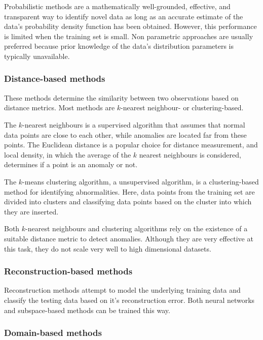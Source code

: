 Probabilistic methods are a mathematically well-grounded, effective, and transparent way to identify novel data as long as an accurate estimate of the data's probability density function has been obtained. However, this performance is limited when the training set is small. Non parametric approaches are usually preferred because prior knowledge of the data's distribution parameters is typically unavailable.

\subsubsection{Distance-based methods}

These methods determine the similarity between two observations based on distance metrics. Most methods are $k$-nearest neighbour- or clustering-based.\par

The $k$-nearest neighbours is a supervised algorithm that assumes that normal data points are close to each other, while anomalies are located far from these points. The Euclidean distance is a popular choice for distance measurement, and local density, in which the average of the $k$ nearest neighbours is considered, determines if a point is an anomaly or not.\par

The $k$-means clustering algorithm, a unsupervised algorithm, is a clustering-based method for identifying abnormalities. Here, data points from the training set are divided into clusters and classifying data points based on the cluster into which they are inserted.\par

Both $k$-nearest neighbours and clustering algorithms rely on the existence of a suitable distance metric to detect anomalies. Although they are very effective at this task, they do not scale very well to high dimensional datasets.

\subsubsection{Reconstruction-based methods}

Reconstruction methods attempt to model the underlying training data and classify the testing data based on it's reconstruction error. Both neural networks and subspace-based methods can be trained this way.

\subsubsection{Domain-based methods}

